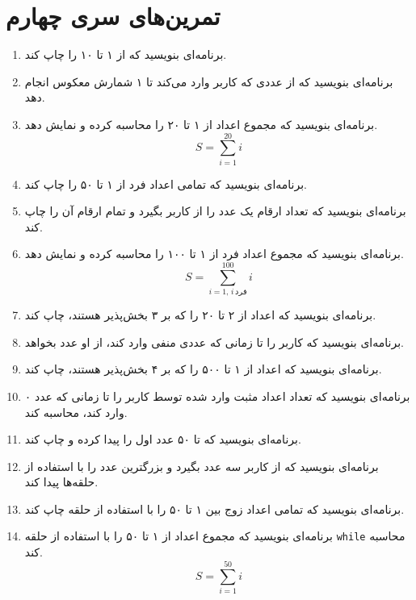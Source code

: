 \documentclass[a4paper,12pt]{article}
\begin{document}
	\section*{تمرین‌های سری چهارم}
	\begin{enumerate}
		\item برنامه‌ای بنویسید که از ۱ تا ۱۰ را چاپ کند.
		
		\item برنامه‌ای بنویسید که از عددی که کاربر وارد می‌کند تا ۱ شمارش معکوس انجام دهد.
		
		\item برنامه‌ای بنویسید که مجموع اعداد از ۱ تا ۲۰ را محاسبه کرده و نمایش دهد.
		\[
		S = \sum_{i=1}^{20} i
		\]
		
		\item برنامه‌ای بنویسید که تمامی اعداد فرد از ۱ تا ۵۰ را چاپ کند.
		
		\item برنامه‌ای بنویسید که تعداد ارقام یک عدد را از کاربر بگیرد و تمام ارقام آن را چاپ کند.
		
		\item برنامه‌ای بنویسید که مجموع اعداد فرد از ۱ تا ۱۰۰ را محاسبه کرده و نمایش دهد.
		\[
		S = \sum_{i=1, \, i \, \text{فرد}}^{100} i
		\]
		
		\item برنامه‌ای بنویسید که اعداد از ۲ تا ۲۰ را که بر ۳ بخش‌پذیر هستند، چاپ کند.
		
		\item برنامه‌ای بنویسید که کاربر را تا زمانی که عددی منفی وارد کند، از او عدد بخواهد.
		
		\item برنامه‌ای بنویسید که اعداد از ۱ تا ۵۰۰ را که بر ۴ بخش‌پذیر هستند، چاپ کند.
		
		\item برنامه‌ای بنویسید که تعداد اعداد مثبت وارد شده توسط کاربر را تا زمانی که عدد ۰ وارد کند، محاسبه کند.
		
		\item برنامه‌ای بنویسید که تا ۵۰ عدد اول را پیدا کرده و چاپ کند.
		
		\item برنامه‌ای بنویسید که از کاربر سه عدد بگیرد و بزرگترین عدد را با استفاده از حلقه‌ها پیدا کند.
		
		\item برنامه‌ای بنویسید که تمامی اعداد زوج بین ۱ تا ۵۰ را با استفاده از حلقه چاپ کند.
		
		\item برنامه‌ای بنویسید که مجموع اعداد از ۱ تا ۵۰ را با استفاده از حلقه \texttt{while} محاسبه کند.
		\[
		S = \sum_{i=1}^{50} i
		\]
		

\end{enumerate}
\end{document}
